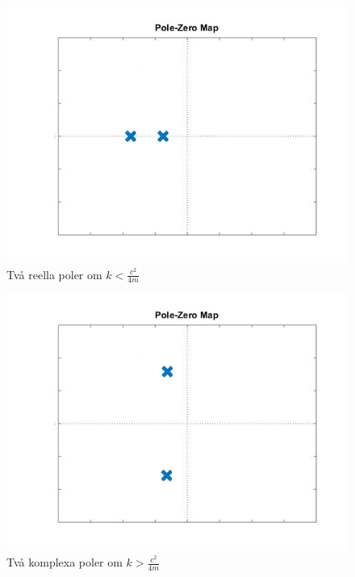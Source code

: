 \documentclass[10pt,a4paper]{article}
\begin{document}
\begin{figure}
\begin{center}
\includegraphics[scale=0.3]{2reella}
\caption{Två reella poler om $k<\frac{c^2}{4m}$}
\end{center}
\end{figure}

\begin{figure}
\begin{center}
\includegraphics[scale=0.3]{2komplexa}
\caption{Två komplexa poler om $k>\frac{c^2}{4m}$}
\end{center}
\end{figure}
\newpage
\end{document}
